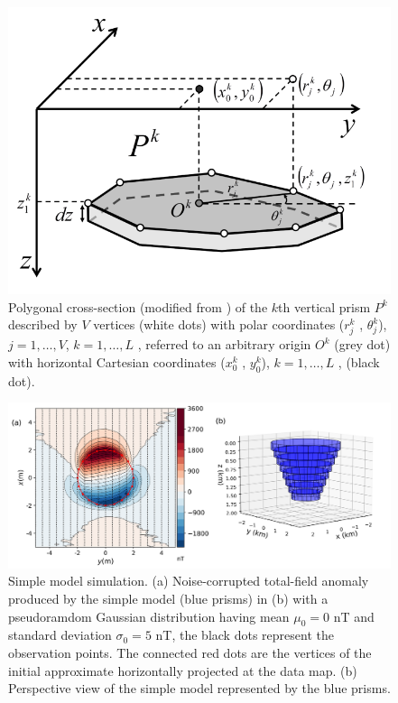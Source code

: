 \begin{figure}
    \centering
    \includegraphics[scale=0.3]{figures/prism_parameters_mod.png}
    \caption{Polygonal cross-section (modified from  \cite{oliveirajr-barbosa2013}) of the $k$th vertical prism $P^k$ described by $V$ vertices (white dots) with polar coordinates ($r^k_j$ , $\theta ^k_j$), $j = 1, \dots, V$, $k = 1, \dots, L$ , referred to an arbitrary origin $O^k$ (grey dot) with horizontal Cartesian coordinates ($x_0^k$ , $y_0^k$), $k = 1, \dots, L$ , (black dot).}
    \label{fig:prism_parameters}
\end{figure}


\begin{figure}
    \centering
    \includegraphics[width=\linewidth]{figures/simple_model_data.png}
    \caption{Simple model simulation. (a) Noise-corrupted total-field anomaly produced by the simple model (blue prisms) in (b) with a pseudoramdom Gaussian distribution having mean $\mu_0 = 0$ nT and standard deviation $\sigma_0 = 5$ nT, the black dots represent the observation points. The connected red dots are the vertices of the initial approximate horizontally projected at the data map. (b) Perspective view of the simple model represented by the blue prisms.
}
    \label{fig:simple_model}
\end{figure}

